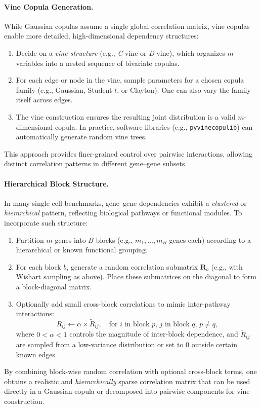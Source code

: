 \documentclass{article}
\begin{document}
\paragraph{Vine Copula Generation.}
While Gaussian copulas assume a single global correlation matrix, vine copulas enable more detailed, high-dimensional dependency structures:
\begin{enumerate}
	\item Decide on a \emph{vine structure} (e.g., \emph{C}-vine or \emph{D}-vine), which organizes $m$ variables into a nested sequence of bivariate copulas.
	\item For each edge or node in the vine, sample parameters for a chosen copula family (e.g., Gaussian, Student-$t$, or Clayton). One can also vary the family itself across edges.
	\item The vine construction ensures the resulting joint distribution is a valid $m$-dimensional copula. In practice, software libraries (e.g., \texttt{pyvinecopulib}) can automatically generate random vine trees.
\end{enumerate}
This approach provides finer-grained control over pairwise interactions, allowing distinct correlation patterns in different gene--gene subsets.

\paragraph{Hierarchical Block Structure.}
In many single-cell benchmarks, gene--gene dependencies exhibit a \emph{clustered} or \emph{hierarchical} pattern, reflecting biological pathways or functional modules. To incorporate such structure:
\begin{enumerate}
	\item Partition $m$ genes into $B$ blocks (e.g., $m_1, \dots, m_B$ genes each) according to a hierarchical or known functional grouping.
	\item For each block $b$, generate a random correlation submatrix $\mathbf{R}_b$ (e.g., with Wishart sampling as above). Place these submatrices on the diagonal to form a block-diagonal matrix.
	\item Optionally add small cross-block correlations to mimic inter-pathway interactions:
	\[
	R_{ij} \leftarrow \alpha \times \tilde{R}_{ij}, 
	\quad \text{for } i \text{ in block } p, \, j \text{ in block } q, \, p \neq q,
	\]
	where $0<\alpha <1$ controls the magnitude of inter-block dependence, and $\tilde{R}_{ij}$ are sampled from a low-variance distribution or set to $0$ outside certain known edges.
\end{enumerate}
By combining block-wise random correlation with optional cross-block terms, one obtains a realistic and \emph{hierarchically} sparse correlation matrix that can be used directly in a Gaussian copula or decomposed into pairwise components for vine construction.
\end{document}
